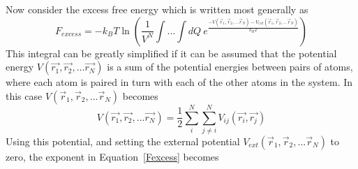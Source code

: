 \documentclass[12pt]{article}
\begin{document}
Now consider the excess free energy which is written most generally as
\begin{equation}\label{Fexcess}{F_{excess}= -k_BT\ln{\left(\frac{1}{V^N}\int{...}\int{dQ}~e^\frac{-V(\vec{r}_1, \vec{r}_2,...\vec{r}_N)-V_{ext}(\vec{r}_1, \vec{r}_2,...\vec{r}_N)}{k_BT}\right)}}\end{equation} 
This integral can be greatly simplified if it can be assumed that the potential energy $V(\vec{r_1},\vec{r_2},...\vec{r_N})$ is a sum of the potential energies between pairs of atoms, where each atom is paired in turn with each of the other atoms in the system. In this case $V(\vec{r}_1, \vec{r}_2,...\vec{r}_N)$ becomes 
\begin{equation}{V(\vec{r_1},\vec{r_2},...\vec{r_N})=\frac{1}{2}\sum^N_i\sum^N_{j\neq{i}}V_{ij}(\vec{r_i},\vec{r_j})}\end{equation} 
Using this potential, and setting the external potential $V_{ext}(\vec{r}_1, \vec{r}_2,...\vec{r}_N)$ to zero, the exponent in Equation~\ref{Fexcess} becomes
\end{document}
